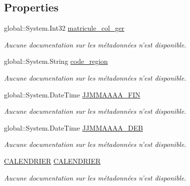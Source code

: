 \subsection*{Properties}
\begin{DoxyCompactItemize}
\item 
global\-::\-System.\-Int32 \hyperlink{class_model_1_1_g_e_r_e_a6976ff90929344b89d6329df4f8b7648}{matricule\-\_\-col\-\_\-ger}
\begin{DoxyCompactList}\small\item\em Aucune documentation sur les métadonnées n'est disponible. \end{DoxyCompactList}\item 
global\-::\-System.\-String \hyperlink{class_model_1_1_g_e_r_e_ab75ef8c99d225e8c5e4cf95012d54287}{code\-\_\-region}
\begin{DoxyCompactList}\small\item\em Aucune documentation sur les métadonnées n'est disponible. \end{DoxyCompactList}\item 
global\-::\-System.\-Date\-Time \hyperlink{class_model_1_1_g_e_r_e_ad81d5bfe8fda3ba990d89ed4f31c282f}{J\-J\-M\-M\-A\-A\-A\-A\-\_\-\-F\-I\-N}
\begin{DoxyCompactList}\small\item\em Aucune documentation sur les métadonnées n'est disponible. \end{DoxyCompactList}\item 
global\-::\-System.\-Date\-Time \hyperlink{class_model_1_1_g_e_r_e_a958847177a345b8807e3f3a5a0e7723e}{J\-J\-M\-M\-A\-A\-A\-A\-\_\-\-D\-E\-B}
\begin{DoxyCompactList}\small\item\em Aucune documentation sur les métadonnées n'est disponible. \end{DoxyCompactList}\item 
\hyperlink{class_model_1_1_c_a_l_e_n_d_r_i_e_r}{C\-A\-L\-E\-N\-D\-R\-I\-E\-R} \hyperlink{class_model_1_1_g_e_r_e_a449b547ec0dae7611bdb626f4a712c2e}{C\-A\-L\-E\-N\-D\-R\-I\-E\-R}
\begin{DoxyCompactList}\small\item\em Aucune documentation sur les métadonnées n'est disponible. \end{DoxyCompactList}\item 

\end{DoxyCompactItemize}
